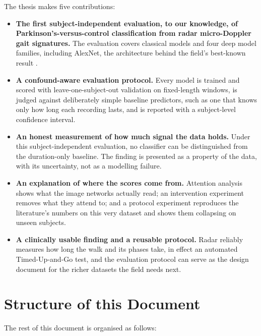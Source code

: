 The thesis makes five contributions:

\begin{itemize}
  \item \textbf{The first subject-independent evaluation, to our knowledge,
        of Parkinson's-versus-control classification from radar
        micro-Doppler gait signatures.} The evaluation covers classical
        models and four deep model families, including AlexNet, the
        architecture behind the field's best-known result
        \cite{hayashi2021}.
  \item \textbf{A confound-aware evaluation protocol.} Every model is
        trained and scored with leave-one-subject-out validation on
        fixed-length windows, is judged against deliberately simple
        baseline predictors, such as one that knows only how long each
        recording lasts, and is reported with a subject-level confidence
        interval.
  \item \textbf{An honest measurement of how much signal the data holds.}
        Under this subject-independent evaluation, no classifier can be
        distinguished from the duration-only baseline. The finding is
        presented as a property of the data, with its uncertainty, not as a
        modelling failure.
  \item \textbf{An explanation of where the scores come from.} Attention
        analysis shows what the image networks actually read; an
        intervention experiment removes what they attend to; and a protocol
        experiment reproduces the literature's numbers on this very dataset
        and shows them collapsing on unseen subjects.
  \item \textbf{A clinically usable finding and a reusable protocol.} Radar
        reliably measures how long the walk and its phases take, in effect
        an automated Timed-Up-and-Go test, and the evaluation protocol can
        serve as the design document for the richer datasets the field
        needs next.
\end{itemize}

\section{Structure of this Document}
\label{sec:structure}

The rest of this document is organised as follows:

